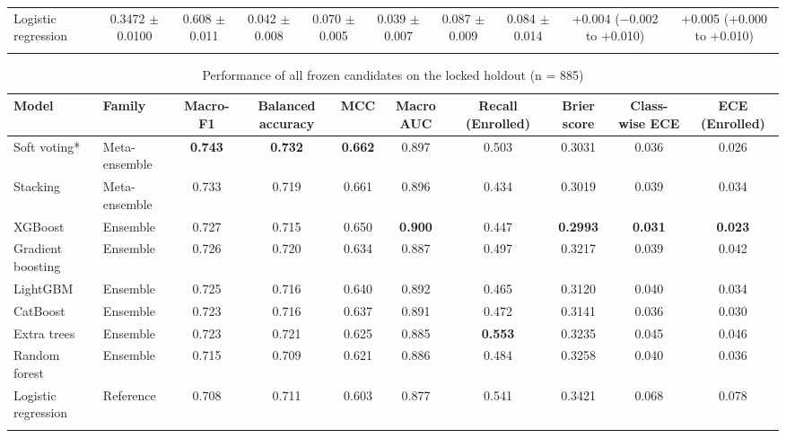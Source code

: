 \begin{table}
\begin{tabular*}{\textwidth}{@{\extracolsep\fill}@{}lccccccccc@{}}
Logistic regression & 0.3472 $\pm$ 0.0100 & 0.608 $\pm$ 0.011 & 0.042 $\pm$ 0.008 & 0.070 $\pm$ 0.005 & 0.039 $\pm$ 0.007 & 0.087 $\pm$ 0.009 & 0.084 $\pm$ 0.014 & +0.004 ($-$0.002 to +0.010) & +0.005 (+0.000 to +0.010) \\
\botrule
\end{tabular*}
\end{table}

\begin{table}
\caption{Performance of all frozen candidates on the locked holdout (n = 885)}\label{tab:Table5_holdout_all}
\footnotesize
\begin{tabular*}{\textwidth}{@{\extracolsep\fill}@{}llcccccccc@{}}
\toprule
Model & Family & Macro-F1 & Balanced accuracy & MCC & Macro AUC & Recall (Enrolled) & Brier score & Class-wise ECE & ECE (Enrolled) \\
\midrule
Soft voting* & Meta-ensemble & \textbf{0.743} & \textbf{0.732} & \textbf{0.662} & 0.897 & 0.503 & 0.3031 & 0.036 & 0.026 \\
Stacking & Meta-ensemble & 0.733 & 0.719 & 0.661 & 0.896 & 0.434 & 0.3019 & 0.039 & 0.034 \\
XGBoost & Ensemble & 0.727 & 0.715 & 0.650 & \textbf{0.900} & 0.447 & \textbf{0.2993} & \textbf{0.031} & \textbf{0.023} \\
Gradient boosting & Ensemble & 0.726 & 0.720 & 0.634 & 0.887 & 0.497 & 0.3217 & 0.039 & 0.042 \\
LightGBM & Ensemble & 0.725 & 0.716 & 0.640 & 0.892 & 0.465 & 0.3120 & 0.040 & 0.034 \\
CatBoost & Ensemble & 0.723 & 0.716 & 0.637 & 0.891 & 0.472 & 0.3141 & 0.036 & 0.030 \\
Extra trees & Ensemble & 0.723 & 0.721 & 0.625 & 0.885 & \textbf{0.553} & 0.3235 & 0.045 & 0.046 \\
Random forest & Ensemble & 0.715 & 0.709 & 0.621 & 0.886 & 0.484 & 0.3258 & 0.040 & 0.036 \\
Logistic regression & Reference & 0.708 & 0.711 & 0.603 & 0.877 & 0.541 & 0.3421 & 0.068 & 0.078 \\
\botrule
\end{tabular*}
\end{table}

